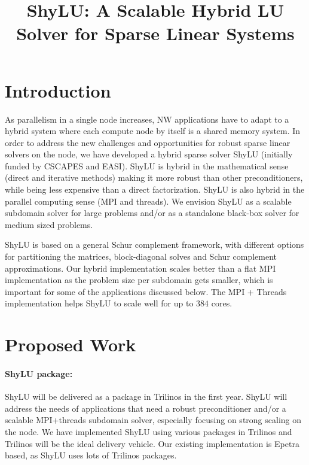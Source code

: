 \documentclass[10pt]{amsart}
\date{}
\title{ShyLU: A Scalable Hybrid LU Solver for Sparse Linear Systems}
\begin{document}
\maketitle

\section{Introduction}

As parallelism in a single node increases, NW applications
have to adapt to a hybrid system where each compute node by itself
is a shared memory system. 
In order to address the new challenges and opportunities 
for robust sparse linear solvers on the node,
we have developed a hybrid sparse solver ShyLU (initially funded by CSCAPES
and EASI). ShyLU is hybrid in the
mathematical sense (direct and iterative methods) making it more
robust than other preconditioners, while being less expensive
than a direct factorization.  ShyLU is also hybrid in the parallel
computing sense (MPI and threads). We envision ShyLU as a scalable
subdomain solver for large problems and/or as a standalone black-box solver
for medium sized problems.

ShyLU is based on a general Schur complement framework, with different options
for partitioning the matrices, block-diagonal solves and Schur complement
approximations.  Our hybrid implementation scales better than
a flat MPI implementation as the problem size per subdomain gets smaller, which
is important for some of the applications discussed below.
The MPI + Threads implementation helps ShyLU to scale well for up
to $384$ cores.

\section{Proposed Work}

\paragraph{\bf{ShyLU package}:}
ShyLU will be delivered as a package in Trilinos in the first year.
ShyLU will address the needs of applications that need a robust preconditioner
and/or a scalable MPI+threads subdomain solver, especially focusing on
strong scaling on the node.
We have implemented ShyLU using various packages in Trilinos and Trilinos will
be the ideal delivery vehicle. Our existing implementation is Epetra based,
as ShyLU uses lots of Trilinos packages.
\end{document}

